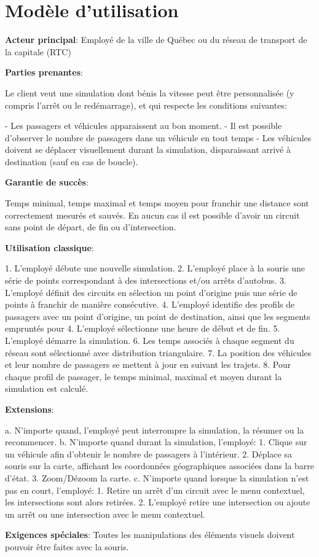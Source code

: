 \section{Modèle d'utilisation}
\label{Use Case}

\textbf{Acteur principal}: Employé de la ville de Québec ou du réseau de transport de la capitale (RTC)

\textbf{Parties prenantes}:

Le client veut une simulation dont bénis la vitesse peut être personnalisée (y compris l'arrêt ou le redémarrage), et qui respecte les conditions suivantes: 

- Les passagers et véhicules apparaissent au bon moment. 
- Il est possible d'observer le nombre de passagers dans un véhicule en tout temps
- Les véhicules doivent se déplacer visuellement durant la simulation, disparaissant arrivé à destination (sauf en cas de boucle).

\textbf{Garantie de succès}:

Temps minimal, temps maximal et temps moyen pour franchir une distance sont correctement mesurés et sauvés. En aucun cas il est possible d'avoir un circuit sans point de départ, de fin ou d'intersection.

\textbf{Utilisation classique}:

1. L'employé débute une nouvelle simulation.
2. L'employé place à la souris une série de points correspondant à des intersections et/ou arrêts d'autobus.
3. L'employé définit des circuits en sélection un point d'origine puis une série de points à franchir de manière consécutive.
4. L'employé identifie des profils de passagers avec un point d'origine, un point de destination, ainsi que les segments empruntés pour 
4. L'employé sélectionne une heure de début et de fin.
5. L'employé démarre la simulation.
6. Les temps associés à chaque segment du réseau sont sélectionné avec distribution triangulaire.
7. La position des véhicules et leur nombre de passagers se mettent à jour en suivant les trajets.
8. Pour chaque profil de passager, le temps minimal, maximal et moyen durant la simulation est calculé.

\textbf{Extensions}:

a. N'importe quand, l'employé peut interrompre la simulation, la résumer ou la recommencer.
b. N'importe quand durant la simulation, l'employé:
1. Clique sur un véhicule afin d'obtenir le nombre de passagers à l'intérieur.
2. Déplace sa souris sur la carte, affichant les coordonnées géographiques associées dans la barre d'état.
3. Zoom/Dézoom la carte.
c. N'importe quand lorsque la simulation n'est pas en court, l'employé:
1. Retire un arrêt d'un circuit avec le menu contextuel, les intersections sont alors retirées.
2. L'employé retire une intersection ou ajoute un arrêt ou une intersection avec le menu contextuel.

\textbf{Exigences spéciales}: Toutes les manipulations des éléments visuels doivent pouvoir être faites avec la souris.